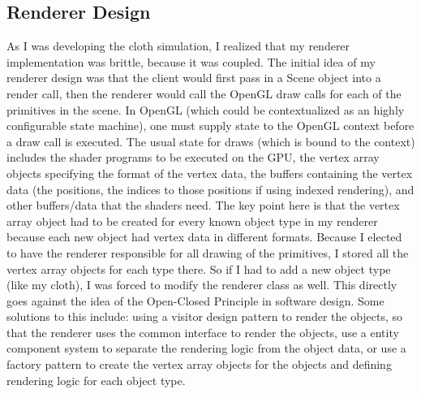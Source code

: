 \documentclass[letterpaper, 10 pt, conference]{ieeeconf}  %
\begin{document}
\subsection{Renderer Design}
        As I was developing the cloth simulation, I realized that my renderer implementation was brittle, because it was coupled. The initial idea of my renderer design was that the client would first pass in a Scene object into a render call, then the renderer would call the OpenGL draw calls for each of the primitives in the scene. In OpenGL (which could be contextualized as an highly configurable state machine), one must supply state to the OpenGL context before a draw call is executed. The usual state for draws (which is bound to the context) includes the shader programs to be executed on the GPU, the vertex array objects specifying the format of the vertex data, the buffers containing the vertex data (the positions, the indices to those positions if using indexed rendering), and other buffers/data that the shaders need. The key point here is that the vertex array object had to be created for every known object type in my renderer because each new object had vertex data in different formats. Because I elected to have the renderer responsible for all drawing of the primitives, I stored all the vertex array objects for each type there. So if I had to add a new object type (like my cloth), I was forced to modify the renderer class as well. This directly goes against the idea of the Open-Closed Principle in software design. Some solutions to this include: using a visitor design pattern to render the objects, so that the renderer uses the common interface to render the objects, use a entity component system to separate the rendering logic from the object data, or use a factory pattern to create the vertex array objects for the objects and defining rendering logic for each object type.
\end{document}
